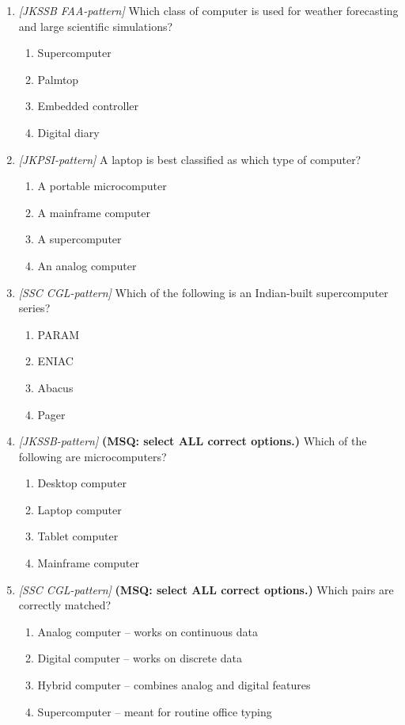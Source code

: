 \documentclass[11pt]{article}
\begin{document}
\begin{enumerate}[label=\textbf{Q\arabic*.}, leftmargin=*]
\item \textit{[JKSSB FAA-pattern]} Which class of computer is used for weather forecasting and large scientific simulations?
  \begin{enumerate}[label=\Alph*.]
    \item Supercomputer
    \item Palmtop
    \item Embedded controller
    \item Digital diary
  \end{enumerate}
\item \textit{[JKPSI-pattern]} A laptop is best classified as which type of computer?
  \begin{enumerate}[label=\Alph*.]
    \item A portable microcomputer
    \item A mainframe computer
    \item A supercomputer
    \item An analog computer
  \end{enumerate}
\item \textit{[SSC CGL-pattern]} Which of the following is an Indian-built supercomputer series?
  \begin{enumerate}[label=\Alph*.]
    \item PARAM
    \item ENIAC
    \item Abacus
    \item Pager
  \end{enumerate}
\item \textit{[JKSSB-pattern]} \textbf{(MSQ: select ALL correct options.)} Which of the following are microcomputers?
  \begin{enumerate}[label=\Alph*.]
    \item Desktop computer
    \item Laptop computer
    \item Tablet computer
    \item Mainframe computer
  \end{enumerate}
\item \textit{[SSC CGL-pattern]} \textbf{(MSQ: select ALL correct options.)} Which pairs are correctly matched?
  \begin{enumerate}[label=\Alph*.]
    \item Analog computer -- works on continuous data
    \item Digital computer -- works on discrete data
    \item Hybrid computer -- combines analog and digital features
    \item Supercomputer -- meant for routine office typing
  \end{enumerate}
\end{enumerate}
\def\JKSSBLessonID{2}\def\JKSSBAnswers{0}
\end{document}

